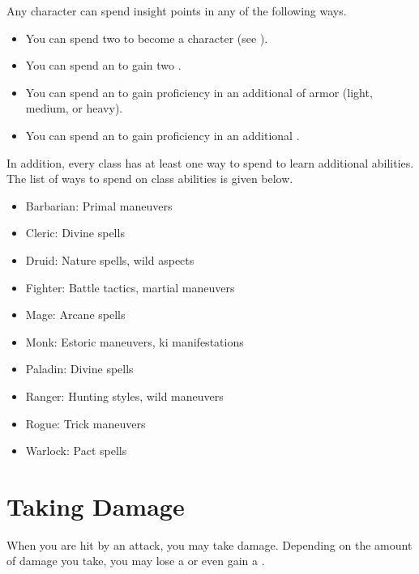         Any character can spend insight points in any of the following ways.
        \begin{itemize}
            \item You can spend two  to become a  character (see ).
            \item You can spend an  to gain two .
            \item You can spend an  to gain proficiency in an additional  of armor (light, medium, or heavy).
            \item You can spend an  to gain proficiency in an additional .
        \end{itemize}
        In addition, every class has at least one way to spend  to learn additional abilities.
        The list of ways to spend  on class abilities is given below.
        \begin{itemize}
            \item Barbarian: Primal maneuvers
            \item Cleric: Divine spells
            \item Druid: Nature spells, wild aspects
            \item Fighter: Battle tactics, martial maneuvers
            \item Mage: Arcane spells
            \item Monk: Estoric maneuvers, ki manifestations
            \item Paladin: Divine spells
            \item Ranger: Hunting styles, wild maneuvers
            \item Rogue: Trick maneuvers
            \item Warlock: Pact spells
        \end{itemize}

\section{Taking Damage}\label{Taking Damage}

    When you are hit by an attack, you may take damage.
    Depending on the amount of damage you take, you may lose a  or even gain a .

